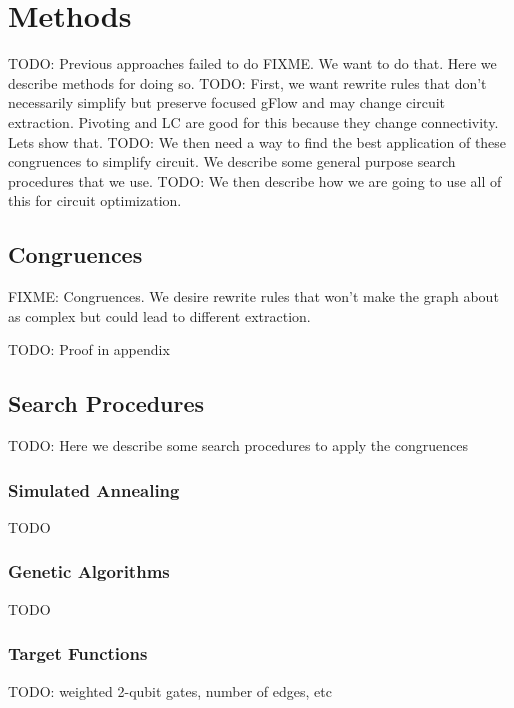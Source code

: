 \chapter[Methods]{Methods} \label{ch:methods}

TODO: Previous approaches failed to do FIXME. We want to do that. Here we describe methods for doing so.
TODO: First, we want rewrite rules that don't necessarily simplify but preserve focused gFlow and may change circuit extraction. Pivoting and LC are good for this because they change connectivity. Lets show that.
TODO: We then need a way to find the best application of these congruences to simplify circuit. We describe some general purpose search procedures that we use.
TODO: We then describe how we are going to use all of this for circuit optimization.

\section{Congruences}

FIXME: Congruences. We desire rewrite rules that won't make the graph about as complex but could lead to different extraction.

TODO: Proof in appendix

\section{Search Procedures}

TODO: Here we describe some search procedures to apply the congruences

\subsection{Simulated Annealing}

TODO

\subsection{Genetic Algorithms}

TODO

\subsection{Target Functions}

TODO: weighted 2-qubit gates, number of edges, etc


